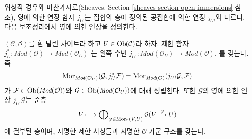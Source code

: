 \noindent
위상적 경우와 마찬가지로(Sheaves, Section
\ref{sheaves-section-open-immersions} 참조), 영에 의한 연장 함자 $j_{U!}$는
집합의 층에 정의된 공집합에 의한 연장 $j_{U!}$와 다르다.
다음 보조정리에서 영에 의한 연장을 정의한다.

\begin{lemma}
\label{lemma-extension-by-zero}
$(\mathcal{C}, \mathcal{O})$를 환 달린 사이트라 하고
$U \in \mathop{\mathrm{Ob}}\nolimits(\mathcal{C})$라 하자. 제한 함자
$j_U^* : \textit{Mod}(\mathcal{O}) \to \textit{Mod}(\mathcal{O}_U)$
는 왼쪽 수반
$j_{U!} : \textit{Mod}(\mathcal{O}_U) \to \textit{Mod}(\mathcal{O})$.
를 갖는다. 즉
$$
\mathop{\mathrm{Mor}}\nolimits_{\textit{Mod}(\mathcal{O}_U)}(\mathcal{G}, j_U^*\mathcal{F})
=
\mathop{\mathrm{Mor}}\nolimits_{\textit{Mod}(\mathcal{O})}(j_{U!}\mathcal{G}, \mathcal{F})
$$
가 $\mathcal{F} \in \mathop{\mathrm{Ob}}\nolimits(\textit{Mod}(\mathcal{O}))$와
$\mathcal{G} \in \mathop{\mathrm{Ob}}\nolimits(\textit{Mod}(\mathcal{O}_U))$에 대해 성립한다.
또한 $\mathcal{G}$의 영에 의한 연장 $j_{U!}\mathcal{G}$는 준층
$$
V
\longmapsto
\bigoplus\nolimits_{\varphi \in \mathop{\mathrm{Mor}}\nolimits_\mathcal{C}(V, U)}
\mathcal{G}(V \xrightarrow{\varphi} U)
$$
에 결부된 층이며, 자명한 제한 사상들과 자명한 $\mathcal{O}$-가군
구조를 갖는다.
\end{lemma}

